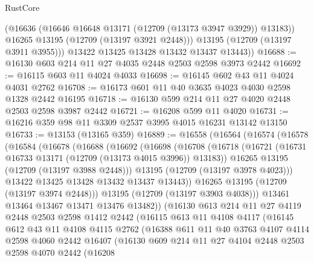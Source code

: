 \begin{lexlean}{RustCore}
\begin{coremodule}
            (@16636 (@16646 @16648 @13171 (@12709 (@13173 @3947 @3929)) @13183))
            @16265
            @13195
            (@12709 (@13197 @3921 @2448)))
          @13195
          (@12709 (@13197 @3911 @3955)))
        @13422
        @13425
        @13428
        @13432
        @13437
        @13443))
@16688 := @16130 @603 @214 @11 @27 @4035 @2448 @2503 @2598 @3973 @2442
@16692 := @16115 @603 @11 @4024 @4033
@16698 := @16145 @602 @43 @11 @4024 @4031 @2762
@16708 := @16173 @601 @11 @40 @3635 @4023 @4030 @2598 @1328 @2442 @16195
@16718 := @16130 @599 @214 @11 @27 @4020 @2448 @2503 @2598 @3987 @2442
@16721 := @16208 @599 @11 @4020
@16731 := @16216 @359 @98 @11 @3309 @2537 @3995 @4015 @16231 @13142 @13150
@16733 := @13153 (@13165 @359)
@16889 := @16558
    (@16564
      (@16574
        (@16578
          (@16584
            (@16678
              (@16688
                (@16692
                  (@16698
                    (@16708
                      (@16718
                        (@16721 (@16731 @16733 @13171 (@12709 (@13173 @4015 @3996)) @13183))
                        @16265
                        @13195
                        (@12709 (@13197 @3988 @2448)))
                      @13195
                      (@12709 (@13197 @3978 @4023)))
                    @13422
                    @13425
                    @13428
                    @13432
                    @13437
                    @13443))
                @16265
                @13195
                (@12709 (@13197 @3974 @2448)))
              @13195
              (@12709 (@13197 @3903 @4038)))
            @13461
            @13464
            @13467
            @13471
            @13476
            @13482))
        (@16130
          @613
          @214
          @11
          @27
          @4119
          @2448
          @2503
          @2598
          @1412
          @2442
          (@16115
            @613
            @11
            @4108
            @4117
            (@16145
              @612
              @43
              @11
              @4108
              @4115
              @2762
              (@16388
                @611
                @11
                @40
                @3763
                @4107
                @4114
                @2598
                @4060
                @2442
                @16407
                (@16130
                  @609
                  @214
                  @11
                  @27
                  @4104
                  @2448
                  @2503
                  @2598
                  @4070
                  @2442
                  (@16208

\end{coremodule}
\end{lexlean}

